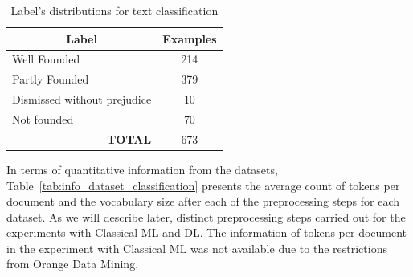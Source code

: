 \begin{table}[htb]
\centering
\caption{Label's distributions for text classification}
\label{tab:cap4_class_distr_label}
\footnotesize
\begin{tabular}{@{}lc@{}}
\toprule
\multicolumn{1}{c}{\textbf{Label}} & \textbf{Examples} \\ \midrule
Well Founded                            & 214               \\
Partly Founded                     & 379               \\
Dismissed without prejudice        & 10                \\
Not founded                        & 70                \\ \midrule
\multicolumn{1}{r}{\textbf{TOTAL}} & 673               \\ \bottomrule
\end{tabular}
\end{table}


In terms of quantitative information from the datasets, Table~\ref{tab:info_dataset_classification} presents the average count of tokens per document and the vocabulary size after each of the preprocessing steps for each dataset. As we will describe later, distinct preprocessing steps carried out for the experiments with Classical \gls{ML} and \gls{DL}. The information of tokens per document in the experiment with Classical ML was not available due to the restrictions from Orange Data Mining.



